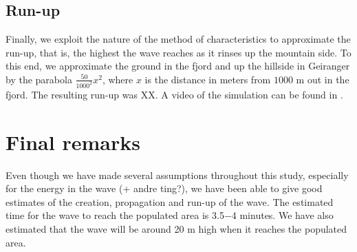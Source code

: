 \documentclass[11pt]{article}
\begin{document}
\subsection{Run-up}
Finally, we exploit the nature of the method of characteristics to approximate the run-up, that is, the highest the wave reaches as it rinses up the mountain side. To this end, we
approximate the ground in the fjord and up the hillside in Geiranger by the parabola $\frac{50}{1000^2}x^2$, where $x$ is the distance in meters from $1000$ m out in the fjord.
The resulting run-up was XX. A video of the simulation can be found in \cite{}.    
%
%
\section{Final remarks}
Even though we have made several assumptions throughout this study, especially for the energy in the wave (+ andre ting?), we have been able to give good estimates of the creation,
propagation and run-up of the wave. The estimated time for the wave to reach  the populated area is 3.5$-$4 minutes. We have also estimated that the wave will be around 20 m high when it reaches the populated area. 


  
\end{document}
